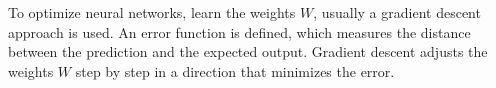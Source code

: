 To optimize neural networks, \ie learn the weights $W$, usually a gradient descent approach is used.
An error function is defined, which measures the distance between the prediction and the expected output.
Gradient descent adjusts the weights $W$ step by step in a direction that minimizes the error.
